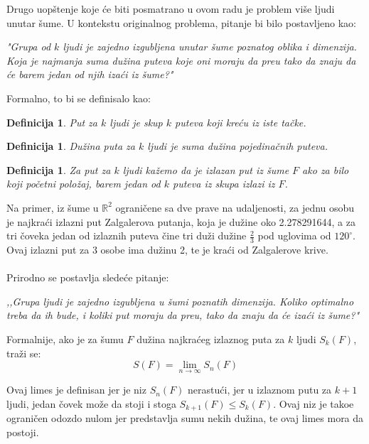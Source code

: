 \documentclass[11pt,letter]{article}
\newtheorem{df}[teo]{\bf Definicija}
\begin{document}
\indent Drugo uop\v stenje koje \' ce biti posmatrano u ovom radu je problem vi\v se ljudi unutar \v sume. U kontekstu originalnog problema, pitanje bi bilo postavljeno kao:
\begin{center}
\textit{"Grupa od $k$ ljudi je zajedno izgubljena unutar \v sume poznatog oblika i dimenzija. Koja je najmanja suma du\v zina puteva koje oni moraju da pre\dj u tako da znaju da \' ce barem jedan od njih iza\' ci iz \v sume?"}
\end{center}
\newpage
Formalno, to bi se definisalo kao:
\begin{df} Put za $k$ ljudi je skup $k$ puteva koji kre\' cu iz iste ta\v cke. \end{df}
\begin{df} Du\v zina puta za $k$ ljudi je suma du\v zina pojedina\v cnih puteva.\end{df}
\begin{df} Za put za $k$ ljudi ka\v zemo da je izlazan put iz \v sume $F$ ako za bilo koji po\v cetni polo\v zaj, barem jedan od $k$ puteva iz skupa izlazi iz $F$.\end{df}
\smallskip

\indent Na primer, iz \v sume u $\mathbb{R}^2$ ograni\v cene sa dve prave na udaljenosti, za jednu osobu je najkra\' ci izlazni put Zalgalerova putanja, koja je du\v zine oko 2.278291644, a za tri \v coveka jedan od izlaznih puteva \v cine tri du\v zi du\v zine $\frac{2}{3}$ pod uglovima od $120^\circ$. Ovaj izlazni put za 3 osobe ima du\v zinu 2, te je kra\' ci od Zalgalerove krive.
\\
\smallskip
\\
\indent Prirodno se postavlja slede\' ce pitanje:
\begin{center}
\textit{,,Grupa ljudi je zajedno izgubljena u \v sumi poznatih dimenzija. Koliko optimalno treba da ih bude, i koliki put moraju da pre\dj u, tako da znaju da \' ce iza\' ci iz \v sume?"}
\end{center}
Formalnije, ako je za \v sumu $F$ du\v zina najkra\' ceg izlaznog puta za $k$ ljudi $S_k(F)$, tra\v zi se:
$$S(F)=\lim_{n \to \infty} S_n(F)$$

\indent Ovaj limes je definisan jer je niz $S_n(F)$ nerastu\' ci, jer u izlaznom putu za $k+1$ ljudi, jedan \v covek mo\v ze da stoji i stoga $S_{k+1}(F)\leqslant S_{k}(F)$. Ovaj niz je tako\dj e ograni\v cen odozdo nulom jer predstavlja sumu nekih du\v zina, te ovaj limes mora da postoji. 
\\
\end{document}
